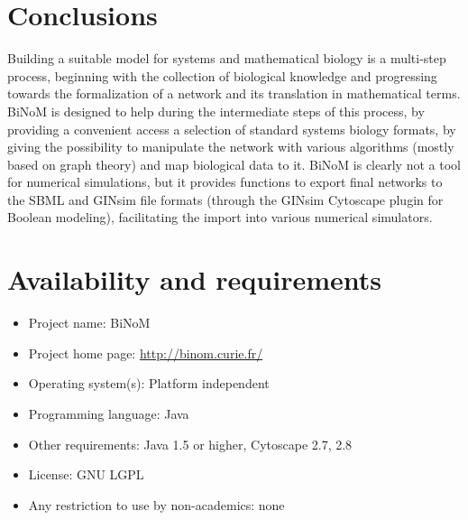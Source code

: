 \documentclass[10pt]{bmc_article}
\newenvironment{bmcformat}{\baselineskip20pt\sloppy\setboolean{publ}{false}}{\baselineskip20pt\sloppy}
\begin{document}
\begin{bmcformat}
\section*{Conclusions}

Building a suitable model for systems and mathematical biology is a multi-step
process, beginning with the collection of biological knowledge and progressing
towards the formalization of a network and its translation in mathematical
terms. BiNoM is designed to help during the intermediate steps of this process,
by providing a convenient access a selection of standard systems biology
formats, by giving the possibility to manipulate the
network with various algorithms (mostly based on graph theory)
and map biological data to it. BiNoM is clearly not a tool for numerical
simulations, but it provides functions to export final networks to the SBML and
GINsim file formats (through the GINsim Cytoscape plugin for Boolean modeling), facilitating the
import into various numerical simulators.

\section*{Availability and requirements}

\begin{itemize}
\item Project name: BiNoM
\item Project home page: \url{http://binom.curie.fr/}
\item Operating system(s): Platform independent
\item Programming language: Java
\item Other requirements: Java 1.5 or higher, Cytoscape 2.7, 2.8
\item License: GNU LGPL
\item Any restriction to use by non-academics: none
\end{itemize}




\end{bmcformat}
\end{document}
